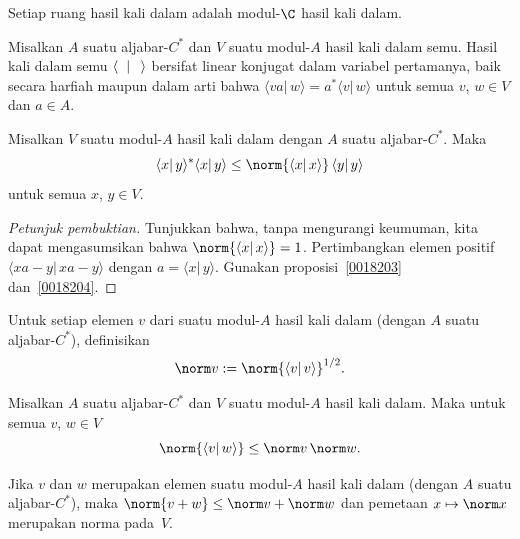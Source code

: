 \begin{exam} Setiap ruang hasil kali dalam adalah modul-$\C$ hasil kali dalam.
\end{exam}

\begin{prop} Misalkan $A$ suatu aljabar-$C^*$ dan $V$ suatu modul-$A$ hasil kali dalam semu.
Hasil kali dalam semu $\langle\hphantom{x}\vert\,\hphantom{x}\rangle$ bersifat linear konjugat
dalam variabel pertamanya, baik secara harfiah maupun dalam arti bahwa $\langle va \vert\,
w\rangle = a^* \langle v \vert\, w\rangle$ untuk semua $v$, $w \in V$ dan $a \in A$.
\end{prop}

\begin{prop}\label{0038038} Misalkan
$V$ suatu modul-$A$ hasil kali dalam dengan $A$ suatu aljabar-$C^*$. Maka
  \[ \langle x\vert\, y \rangle^*\langle x\vert\, y \rangle
          \le \norm{\langle x\vert\, x \rangle}\,\langle y\vert\, y \rangle \]
untuk semua $x$, $y \in V$.
\end{prop}

\begin{proof}[\emph{Petunjuk pembuktian}] Tunjukkan bahwa, tanpa mengurangi keumuman,
kita dapat mengasumsikan bahwa
$\norm{\langle x\vert\, x\rangle} = 1$. Pertimbangkan elemen positif $\langle xa -
y\vert\, xa - y\rangle$ dengan $a = \langle x \vert\, y \rangle$. Gunakan
proposisi~\ref{0018203} dan~\ref{0018204}. \ns
\end{proof}

\begin{defn}\label{0038041} Untuk setiap elemen $v$ dari suatu modul-$A$ hasil kali dalam
(dengan $A$ suatu aljabar-$C^*$), definisikan
  \[ \norm v := \norm{\langle v \vert\, v \rangle}^{1/2}. \]
\end{defn}

\begin{prop} Misalkan $A$ suatu aljabar-$C^*$ dan $V$ suatu
modul-$A$ hasil kali dalam. Maka untuk semua $v$, $w \in V$
  \[ \norm{\langle v \vert\, w\rangle} \le \norm v\,\norm w. \]
\end{prop}

\begin{cor} Jika $v$ dan $w$ merupakan elemen suatu modul-$A$ hasil kali dalam (dengan $A$ suatu
aljabar-$C^*$), maka $\norm{v + w} \le \norm v + \norm w$ dan pemetaan $x \mapsto \norm x$
merupakan norma pada~$V$.
\end{cor}

